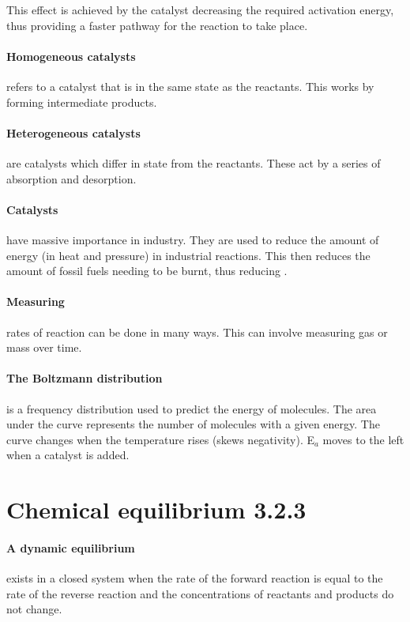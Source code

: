 	This effect is achieved by the catalyst decreasing the required activation energy, thus providing a faster pathway for the reaction to take place.
	
	\paragraph{Homogeneous catalysts} refers to a catalyst that is in the same state as the reactants. This works by forming intermediate products.
	
	\paragraph{Heterogeneous catalysts} are catalysts which differ in state from the reactants. These act by a series of absorption and desorption.
	
	\paragraph{Catalysts} have massive importance in industry. They are used to reduce the amount of energy (in heat and pressure) in industrial reactions. This then reduces the amount of fossil fuels needing to be burnt, thus reducing .
	
	\paragraph{Measuring} rates of reaction can be done in many ways. This can involve measuring gas or mass over time.
	
	\paragraph{The Boltzmann distribution} is a frequency distribution used to predict the energy of molecules. The area under the curve represents the number of molecules with a given energy. The curve changes when the temperature rises (skews negativity). E$_a$ moves to the left when a catalyst is added.
	
\section{Chemical equilibrium 3.2.3}

	\paragraph{A dynamic equilibrium} exists in a closed system when the rate of the forward reaction is equal to the rate of the reverse reaction and the concentrations of reactants and products do not change.
	
